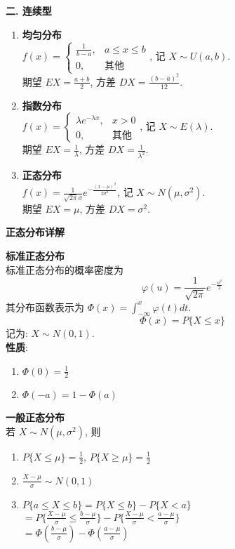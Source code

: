 \documentclass[padp]{ExBook}
\begin{document}
\vspace{1em}
\textbf{二. 连续型}
\begin{enumerate}[label=\arabic*.]
    \item \textbf{均匀分布} \\
    $f(x) = \begin{cases} \frac{1}{b-a}, & a \le x \le b \\ 0, & \text{其他} \end{cases}$, 记 $X \sim U(a,b)$. \\
    期望 $EX = \frac{a+b}{2}$, 方差 $DX=\frac{(b-a)^2}{12}$.
    
    \item \textbf{指数分布} \\
    $f(x) = \begin{cases} \lambda e^{-\lambda x}, & x > 0 \\ 0, & \text{其他} \end{cases}$, 记 $X \sim E(\lambda)$. \\
    期望 $EX = \frac{1}{\lambda}$, 方差 $DX = \frac{1}{\lambda^2}$.
    
    \item \textbf{正态分布} \\
    $f(x) = \frac{1}{\sqrt{2\pi}\sigma}e^{-\frac{(x-\mu)^2}{2\sigma^2}}$, 记 $X \sim N(\mu, \sigma^2)$. \\
    期望 $EX = \mu$, 方差 $DX = \sigma^2$.
\end{enumerate}

\hrulefill
\vspace{1em}

\textbf{正态分布详解}
\vspace{1em}

\textbf{标准正态分布} \\
标准正态分布的概率密度为
$$ \varphi(u) = \frac{1}{\sqrt{2\pi}}e^{-\frac{u^2}{2}} $$
其分布函数表示为 $\Phi(x) = \int_{-\infty}^{x} \varphi(t)dt$.
$$ \Phi(x) = P\{X \le x\} $$
记为: $X \sim N(0,1)$. \\
\textbf{性质}: 
\begin{enumerate}[label=\arabic*.]
    \item $\Phi(0)=\frac{1}{2}$
    \item $\Phi(-a)=1-\Phi(a)$
\end{enumerate}

\vspace{1em}
\textbf{一般正态分布} \\
若 $X \sim N(\mu, \sigma^2)$, 则
\begin{enumerate}[label=\arabic*.]
    \item $P\{X \le \mu\} = \frac{1}{2}$, $P\{X \ge \mu\} = \frac{1}{2}$
    \item $\frac{X-\mu}{\sigma} \sim N(0,1)$
    \item $P\{a \le X \le b\} = P\{X \le b\} - P\{X < a\}$ \\
    $= P\{\frac{X-\mu}{\sigma} \le \frac{b-\mu}{\sigma}\} - P\{\frac{X-\mu}{\sigma} < \frac{a-\mu}{\sigma}\}$ \\
    $= \Phi(\frac{b-\mu}{\sigma}) - \Phi(\frac{a-\mu}{\sigma})$
\end{enumerate}
\clearpage
\end{document}
